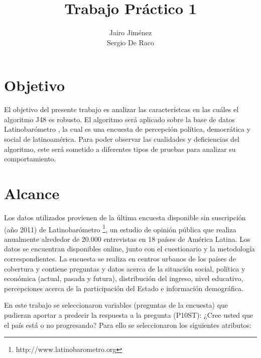 \documentclass[]{article}
\title{Trabajo Práctico 1}
\author{Jairo Jiménez \\
	Sergio De Raco}
\begin{document}
\maketitle


\section*{Objetivo}
El objetivo del presente trabajo es analizar las característcas en las cuáles el algoritmo J48 es robusto. El algoritmo será aplicado sobre la base de datos Latinobarómetro \cite{Latinobarometro2011}, la cual es una encuesta de percepción política, democrática y social de latinoamérica. Para poder observar las cualidades y deficiencias del algoritmo, este será sometido a diferentes tipos de pruebas para analizar su comportamiento.

\section*{Alcance}

Los datos utilizados provienen de la última encuesta disponible sin suscripción (año 2011) de Latinobarómetro \footnote{http://www.latinobarometro.org}, un estudio de opinión pública que realiza anualmente alrededor de 20.000 entrevistas en 18 países de América Latina. Los datos se encuentran disponibles online, junto con el cuestionario y la metodología correspondientes.
La encuesta se realiza en centros urbanos de los países de cobertura y contiene preguntas y datos acerca de la situación social, política y económica (actual, pasada y futura), distribución del ingreso, nivel educativo, percepciones acerca de la participación del Estado e información demográfica.

En este trabajo se seleccionaron variables (preguntas de la encuesta) que pudieran aportar a predecir la respuesta a la pregunta (P10ST):  ¿Cree usted que el país está o no progresando? Para ello se seleccionaron los siguientes atributos: 
\end{document}
